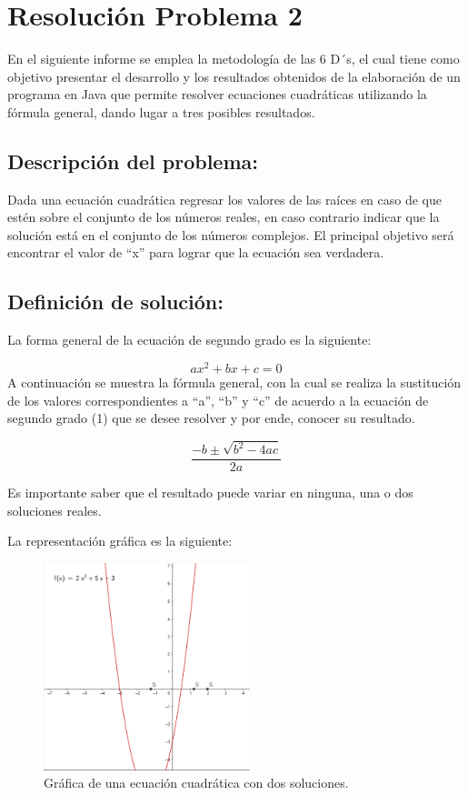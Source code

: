 \section{Resolución Problema 2} 
En el siguiente informe se emplea la metodología de las 6 D´s, el cual tiene como objetivo presentar el desarrollo y los resultados obtenidos de la elaboración de un programa en Java que permite resolver ecuaciones cuadráticas utilizando la fórmula general, dando lugar a tres posibles resultados.
\subsection{\textbf{Descripción del problema:}}
Dada una ecuación cuadrática regresar los valores de las raíces en caso de que estén sobre el conjunto de los números reales, en caso contrario indicar que la solución está en el conjunto de los números complejos. El principal objetivo será encontrar el valor de “x” para lograr que la ecuación sea verdadera.
\subsection{\textbf{Definición de solución:}}
La forma general de la ecuación de segundo grado es la siguiente:

\begin{equation}
    ax^{2}+bx+c=0  
    \label{eqn:ecuacioncuadratica}
\end{equation}
A continuación se muestra la fórmula general, con la cual se realiza la sustitución de los valores correspondientes a “a”, “b” y “c” de acuerdo a la ecuación de segundo grado (1) que se desee resolver y por ende, conocer su resultado.

\begin{equation}
    \frac{-b\pm\sqrt{b^2-4ac}}{2a}
\end{equation}

Es importante saber que el resultado puede variar en ninguna, una o dos soluciones reales.

La representación gráfica es la siguiente:

\begin{figure}[!ht]
\centering
\includegraphics[width=6cm]{LaTeX/latex-imagenes/ejemploGrafica.png}
\caption{Gráfica de una ecuación cuadrática con dos soluciones.}
\label{fig:grafica}
\end{figure}

